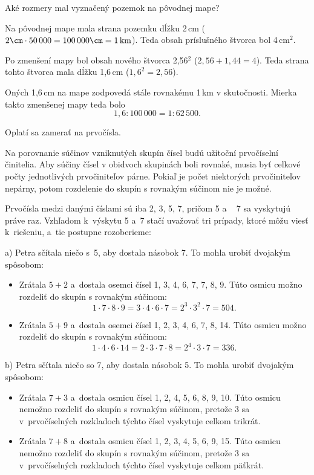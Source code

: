 {%
\napad
Aké rozmery mal vyznačený pozemok na pôvodnej mape?

\riesenie
Na pôvodnej mape mala strana pozemku dĺžku 2\,cm ($2\cm \cdot50\,000 = 100\,000\cm = 1\,\text{km}$).
Teda obsah príslušného štvorca bol 4\,cm$^2$.

Po zmenšení mapy bol obsah nového štvorca 2,56\cm$^2$ ($2{,}56+1{,}44=4$).
Teda strana tohto štvorca mala dĺžku 1,6\,cm ($1{,}6^2=2{,}56$).

Oných 1,6\,cm na mape zodpovedá stále rovnakému 1\,km v skutočnosti.
Mierka takto zmenšenej mapy teda bolo
$$
1{,}6 : 100\,000 = 1 : 62\,500.
$$}

{%
\napad
Oplatí sa zamerať na prvočísla.

\riesenie
Na porovnanie súčinov vzniknutých skupín čísel budú užitoční prvočíselní činitelia.
Aby súčiny čísel v obidvoch skupinách boli rovnaké, musia byť celkové počty jednotlivých prvočiniteľov párne.
Pokiaľ je počet niektorých prvočiniteľov nepárny, potom rozdelenie do skupín s rovnakým súčinom nie je možné.

Prvočísla medzi danými číslami sú iba 2, 3, 5, 7, pričom 5 a ~ 7 sa vyskytujú práve raz.
Vzhľadom k~výskytu 5 a~7 stačí uvažovať tri prípady, ktoré môžu viesť k~riešeniu, a~tie postupne rozoberieme:

\medskip
\noindent
a) Petra sčítala niečo s~5, aby dostala násobok 7.
To mohla urobiť dvojakým spôsobom:
\begin{itemize}
\item Zrátala $5+2$ a~dostala osemci čísel 1, 3, 4, 6, 7, 7, 8, 9.
Túto osmicu možno rozdeliť do skupín s rovnakým súčinom:
$$
1\cdot7\cdot8\cdot9 = 3\cdot4\cdot6\cdot7 = 2^3\cdot3^2\cdot7 = 504.
$$
\item Zrátala $5+9$ a~dostala osemci čísel 1, 2, 3, 4, 6, 7, 8, 14.
Túto osmicu možno rozdeliť do skupín s rovnakým súčinom:
$$
1\cdot4\cdot6\cdot14 = 2\cdot3\cdot7\cdot8 = 2^4\cdot3\cdot7 = 336.
$$
\end{itemize}

\noindent
b) Petra sčítala niečo so 7, aby dostala násobok 5.
To mohla urobiť dvojakým spôsobom:
\begin{itemize}
\item Zrátala $7+3$ a~dostala osmicu čísel 1, 2, 4, 5, 6, 8, 9, 10.
Túto osmicu nemožno rozdeliť do skupín s rovnakým súčinom,
pretože 3 sa v~prvočíselných rozkladoch týchto čísel vyskytuje celkom trikrát.
\item Zrátala $7+8$ a~dostala osmicu čísel 1, 2, 3, 4, 5, 6, 9, 15.
Túto osmicu nemožno rozdeliť do skupín s rovnakým súčinom,
pretože 3 sa v~prvočíselných rozkladoch týchto čísel vyskytuje celkom päťkrát.
\end{itemize}

}
